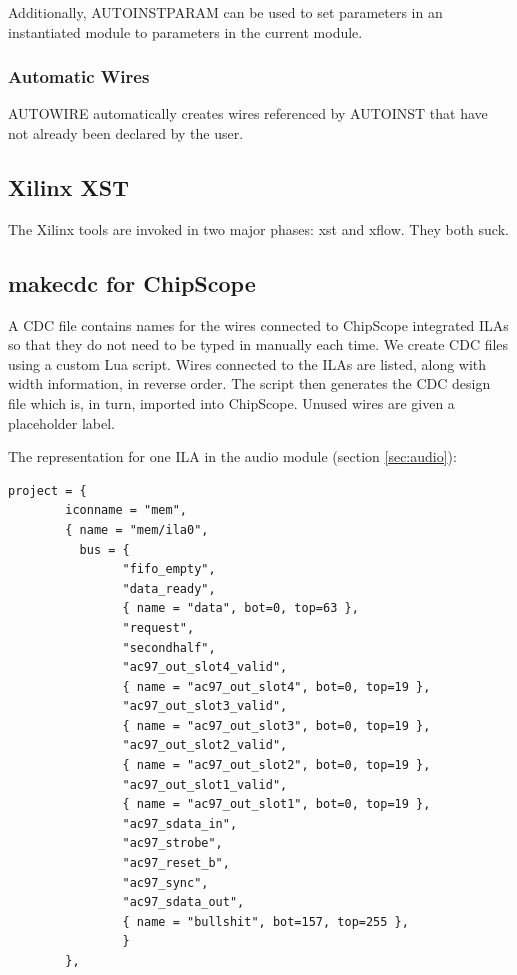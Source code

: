 \documentclass[10pt]{report}
\begin{document}
Additionally, AUTOINSTPARAM can be used to set parameters in an instantiated
module to parameters in the current module.

\subsubsection{Automatic Wires}

AUTOWIRE automatically creates wires referenced by AUTOINST that have not
already been declared by the user.

\subsection{Xilinx XST}

The Xilinx tools are invoked in two major phases: xst and xflow. They both
suck.

\subsection{makecdc for ChipScope}

A CDC file contains names for the wires connected to ChipScope integrated
ILAs so that they do not need to be typed in manually each time.  We create
CDC files using a custom Lua script.  Wires connected to the ILAs are
listed, along with width information, in reverse order.  The script then
generates the CDC design file which is, in turn, imported into ChipScope. 
Unused wires are given a placeholder label.

The representation for one ILA in the audio module (section
\ref{sec:audio}):

\begin{lstlisting}[basicstyle=\footnotesize]
project = {
        iconname = "mem",
        { name = "mem/ila0",
          bus = {
                "fifo_empty",
                "data_ready",
                { name = "data", bot=0, top=63 },
                "request",
                "secondhalf",
                "ac97_out_slot4_valid",
                { name = "ac97_out_slot4", bot=0, top=19 },
                "ac97_out_slot3_valid",
                { name = "ac97_out_slot3", bot=0, top=19 },
                "ac97_out_slot2_valid",
                { name = "ac97_out_slot2", bot=0, top=19 },
                "ac97_out_slot1_valid",
                { name = "ac97_out_slot1", bot=0, top=19 },
                "ac97_sdata_in",
                "ac97_strobe",
                "ac97_reset_b",
                "ac97_sync",
                "ac97_sdata_out",
                { name = "bullshit", bot=157, top=255 },
                }
        },
\end{lstlisting}
\end{document}
